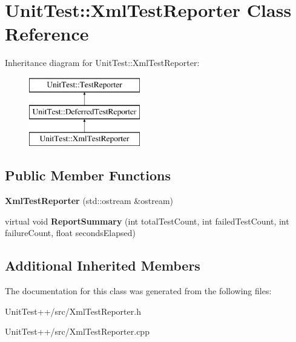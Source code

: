 \hypertarget{classUnitTest_1_1XmlTestReporter}{\section{Unit\-Test\-:\-:Xml\-Test\-Reporter Class Reference}
\label{classUnitTest_1_1XmlTestReporter}
}
Inheritance diagram for Unit\-Test\-:\-:Xml\-Test\-Reporter\-:\begin{figure}[H]
\begin{center}
\leavevmode
\includegraphics[height=3.000000cm]{classUnitTest_1_1XmlTestReporter}
\end{center}
\end{figure}
\subsection*{Public Member Functions}
\begin{DoxyCompactItemize}
\item 
\hypertarget{classUnitTest_1_1XmlTestReporter_ad868bfad11bf38544be0d048d644b922}{{\bfseries Xml\-Test\-Reporter} (std\-::ostream \&ostream)}\label{classUnitTest_1_1XmlTestReporter_ad868bfad11bf38544be0d048d644b922}

\item 
\hypertarget{classUnitTest_1_1XmlTestReporter_ae44aa04baba4574787dc953c6a96db86}{virtual void {\bfseries Report\-Summary} (int total\-Test\-Count, int failed\-Test\-Count, int failure\-Count, float seconds\-Elapsed)}\label{classUnitTest_1_1XmlTestReporter_ae44aa04baba4574787dc953c6a96db86}

\end{DoxyCompactItemize}
\subsection*{Additional Inherited Members}


The documentation for this class was generated from the following files\-:\begin{DoxyCompactItemize}
\item 
Unit\-Test++/src/Xml\-Test\-Reporter.\-h\item 
Unit\-Test++/src/Xml\-Test\-Reporter.\-cpp\end{DoxyCompactItemize}
